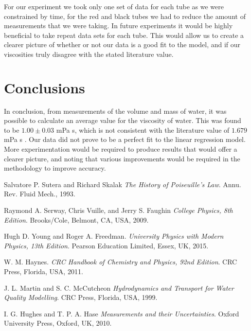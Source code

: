 \documentclass[twocolumn]{revtex4}
\newcommand{\squeezeup}{\vspace{-2.5mm}}
\begin{document}
For our experiment we took only one set of data for each tube as we were constrained by time, for the red and black tubes we had to reduce the amount of measurements that we were taking. In future experiments it would be highly beneficial to take repeat data sets for each tube. This would allow us to create a clearer picture of whether or not our data is a good fit to the model, and if our viscosities truly disagree with the stated literature value. 

\squeezeup

\vspace{-5ex}
\section{Conclusions}
\vspace{-2ex}
In conclusion, from measurements of the volume and mass of water, it was possible to calculate an average value for the viscosity of water. This was found to be $1.00 \pm 0.03$ mPa s, which is not consistent with the literature value of $1.679$  mPa {s} \cite{crc}. Our data did not prove to be a perfect fit to the linear regression model. More experimentation would be required to produce results that would offer a clearer picture, and noting that various improvements would be required in the methodology to improve accuracy.
\squeezeup
\squeezeup

\begin{thebibliography}{5}
	Salvatore P. Sutera and Richard Skalak
	\textit{The History of Poiseuille's Law}.
	Annu. Rev. Fluid Mech., 1993.
	
	Raymond A. Serway, Chris Vuille, and Jerry S. Faughin
	\textit{College Physics, 8th Edition}.
	Brooks/Cole, Belmont, CA, USA, 2009.

	Hugh D. Young and Roger A. Freedman.
	\textit{University Physics with Modern Physics, 13th Edition}. 
	Pearson Education Limited, Essex, UK, 2015.
	
	W. M. Haynes.
	\textit{CRC Handbook of Chemistry and Physics, 92nd Edition}. 
	CRC Press, Florida, USA, 2011.
	
	J. L. Martin and S. C. McCutcheon
	\textit{Hydrodynamics and Transport for Water Quality Modelling}. 
	CRC Press, Florida, USA, 1999.
	
	I. G. Hughes and T. P. A. Hase
	\textit{Measurements and their Uncertainties}. 
	Oxford University Press, Oxford, UK, 2010.
	
\end{thebibliography}
\clearpage
\end{document}
